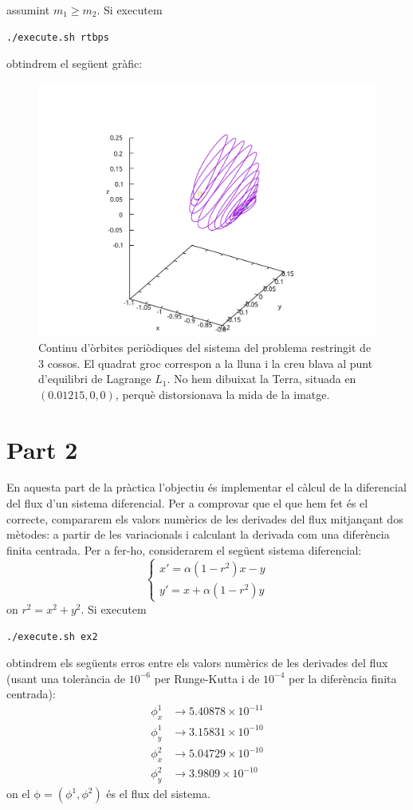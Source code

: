 \documentclass[10pt,a4paper]{article}
\newcommand{\vf}[1]{\boldsymbol{\mathrm{#1}}} %
\theoremstyle{definition}
\theoremstyle{remark}
\begin{document}
assumint $m_1\geq m_2$. Si executem
\begin{lstlisting}[language=Bash]
./execute.sh rtbps
\end{lstlisting}
obtindrem el següent gràfic:
\begin{figure}[ht]
  \centering\vspace{-2cm}
  \includegraphics[width=0.7\linewidth]{Images/rtbps.pdf}
  \caption{Continu d'òrbites periòdiques del sistema del problema restringit de 3 cossos. El quadrat groc correspon a la lluna i la creu blava al punt d'equilibri de Lagrange $L_1$. No hem dibuixat la Terra, situada en $(0.01215, 0, 0)$, perquè distorsionava la mida de la imatge.}
\end{figure}
\section*{Part 2}
En aquesta part de la pràctica l'objectiu és implementar el càlcul de la diferencial del flux d'un sistema diferencial. Per a comprovar que el que hem fet és el correcte, compararem els valors numèrics de les derivades del flux mitjançant dos mètodes: a partir de les variacionals i calculant la derivada com una diferència finita centrada. Per a fer-ho, considerarem el següent sistema diferencial:
$$
  \begin{cases}
    x'=\alpha (1 - r^2)x -y \\
    y'=x+\alpha (1 - r^2)y
  \end{cases}
$$
on $r^2=x^2+y^2$. Si executem
\begin{lstlisting}[language=Bash]
./execute.sh ex2
\end{lstlisting}
obtindrem els següents erros entre els valors numèrics de les derivades del flux (usant una tolerància de $10^{-6}$ per Runge-Kutta i de $10^{-4}$ per la diferència finita centrada):
\begin{align*}
  \phi^1_x & \to 5.40878\times 10^{-11} \\
  \phi^1_y & \to 3.15831\times 10^{-10} \\
  \phi^2_x & \to 5.04729\times 10^{-10} \\
  \phi^2_y & \to 3.9809\times 10^{-10}
\end{align*}
on el $\vf\phi=(\phi^1,\phi^2)$ és el flux del sistema.
\end{document}

